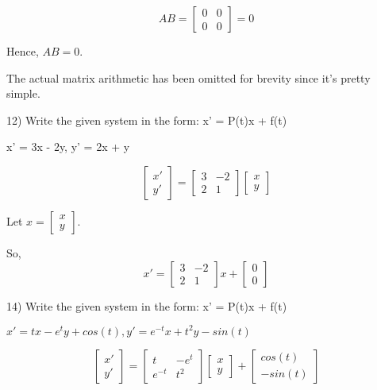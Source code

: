 \documentclass{article}
\begin{document}
\[AB = \begin{bmatrix}
    0 & 0 \\
    0 & 0
\end{bmatrix} = 0\]

Hence, $AB = 0$.

The actual matrix arithmetic has been omitted for brevity since it's pretty simple.


12) Write the given system in the form:
x' = P(t)x + f(t)

x' = 3x - 2y, y' = 2x + y

\[\begin{bmatrix}
    x' \\
    y'
\end{bmatrix} = \begin{bmatrix}
    3 & -2 \\
    2 & 1
\end{bmatrix} \begin{bmatrix}
    x \\
    y
\end{bmatrix}\]

Let $x = \begin{bmatrix}
    x \\
    y
\end{bmatrix}$.

So,
\[x' = \begin{bmatrix}
    3 & -2 \\
    2 & 1
\end{bmatrix} x + \begin{bmatrix}
    0 \\
    0
\end{bmatrix}\]

14) Write the given system in the form:
x' = P(t)x + f(t)

$x' = tx - e^t y + cos(t), y' = e^{-t} x + t^2 y - sin(t)$

\[\begin{bmatrix}
    x' \\
    y'
\end{bmatrix} = \begin{bmatrix}
    t & -e^t \\
    e^{-t} & t^2
\end{bmatrix} \begin{bmatrix}
    x \\
    y
\end{bmatrix} + \begin{bmatrix}
    cos(t) \\
    -sin(t)
\end{bmatrix}\]
\end{document}
